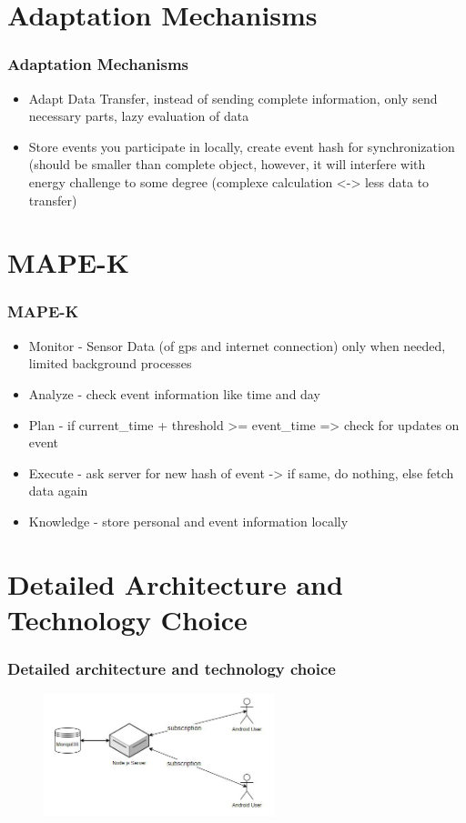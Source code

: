 \documentclass[aspectratio=169]{beamer}
\begin{document}
\section{Adaptation Mechanisms}
\begin{frame}   
	\frametitle{Adaptation Mechanisms}
	\begin{itemize}
		\item Adapt Data Transfer, instead of sending complete information, only send necessary parts, lazy evaluation of data
		\item Store events you participate in locally, create event hash for synchronization (should be smaller than complete object, however, it will interfere with energy challenge to some degree (complexe calculation <-> less data to transfer) 
	\end{itemize}
\end{frame}




\section{MAPE-K}
\begin{frame}   
	\frametitle{MAPE-K}
	\begin{itemize}
		\item Monitor - Sensor Data (of gps and internet connection) only when needed, limited background processes
    		\item Analyze - check event information like time and day 
    		\item Plan - if current\_time + threshold >= event\_time => check for updates on event
    		\item Execute - ask server for new hash of event -> if same, do nothing, else fetch data again
    		\item Knowledge - store personal and event information locally
	\end{itemize}
\end{frame}




\section{Detailed Architecture and Technology Choice}
\begin{frame}
	\frametitle{Detailed architecture and technology choice}
	 \begin{figure}
		\centering
		\includegraphics[width=0.6\textwidth]{media/architecture.jpg}
	\end{figure}
\end{frame}
\end{document}
